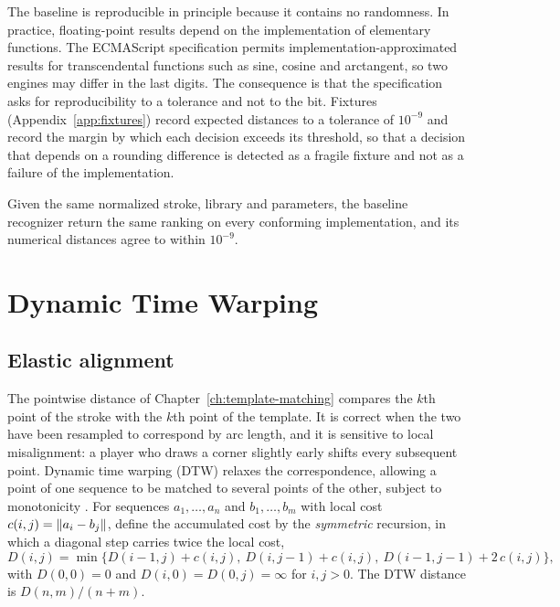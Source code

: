 The baseline is reproducible in principle because it contains no randomness. In practice, floating-point results depend on the implementation of elementary functions. The ECMAScript specification permits implementation-approximated results for transcendental functions such as sine, cosine and arctangent, so two engines may differ in the last digits.\evD{} The consequence is that the specification asks for reproducibility to a tolerance and not to the bit. Fixtures (Appendix~\ref{app:fixtures}) record expected distances to a tolerance of $10^{-9}$ and record the margin by which each decision exceeds its threshold, so that a decision that depends on a rounding difference is detected as a fragile fixture and not as a failure of the implementation.

\begin{requirement}\label{req:baseline-determinism}
Given the same normalized stroke, library and parameters, the baseline recognizer \must{} return the same ranking on every conforming implementation, and its numerical distances \must{} agree to within $10^{-9}$.\evS
\end{requirement}

\chapter{Dynamic Time Warping}\label{ch:dtw}

\section{Elastic alignment}

The pointwise distance of Chapter~\ref{ch:template-matching} compares the $k$th point of the stroke with the $k$th point of the template. It is correct when the two have been resampled to correspond by arc length, and it is sensitive to local misalignment: a player who draws a corner slightly early shifts every subsequent point. Dynamic time warping (DTW) relaxes the correspondence, allowing a point of one sequence to be matched to several points of the other, subject to monotonicity \cite{sakoe1978}.\evD{} For sequences $a_1,\dots,a_n$ and $b_1,\dots,b_m$ with local cost $c(i,j)=\lVert a_i-b_j\rVert$, define the accumulated cost by the \emph{symmetric} recursion, in which a diagonal step carries twice the local cost,
\[
D(i,j)=\min\bigl\{D(i-1,j)+c(i,j),\ D(i,j-1)+c(i,j),\ D(i-1,j-1)+2\,c(i,j)\bigr\},
\]
with $D(0,0)=0$ and $D(i,0)=D(0,j)=\infty$ for $i,j>0$. The DTW distance is $D(n,m)/(n+m)$.

